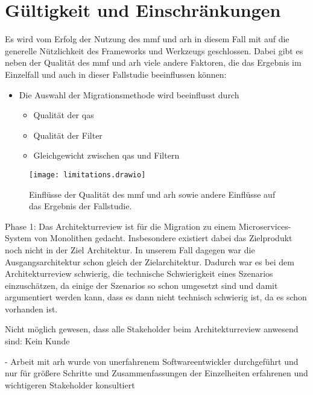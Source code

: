 \chapter{Gültigkeit und Einschränkungen}
\label{chap:gueltigkeit}

Es wird vom Erfolg der Nutzung des \gls{mmf} und \gls{arh} in diesem Fall mit \jf auf die generelle Nützlichkeit des Frameworks und Werkzeugs geschlossen.
Dabei gibt es neben der Qualität des \gls{mmf} und \gls{arh} viele andere Faktoren, die das Ergebnis im Einzelfall und auch in dieser Fallstudie beeinflussen können:

\begin{itemize}
	\item Die Auswahl der Migrationsmethode wird beeinflusst durch
	\begin{itemize}
		\item Qualität der \glspl{qa}
		\item Qualität der Filter
		\item Gleichgewicht zwischen \glspl{qa} und Filtern
	\end{itemize}
\end{itemize}

\begin{figure}
	\centering
	\texttt{[image: limitations.drawio]}
	\caption[Einflüsse auf das Ergebnis der Fallstudie]{
		Einflüsse der Qualität des \gls{mmf} und \gls{arh} sowie andere Einflüsse auf das Ergebnis der Fallstudie.
	}
	\label{fig:limitations}
\end{figure}

Phase 1:
Das Architekturreview ist für die Migration zu einem Microservices-System von Monolithen gedacht.
Insbesondere existiert dabei das Zielprodukt noch nicht in der Ziel Architektur. 
In unserem Fall dagegen war die Ausgangsarchitektur schon gleich der Zielarchitektur.
Dadurch war es bei dem Architekturreview schwierig, die technische Schwierigkeit eines Szenarios einzuschätzen, da einige der Szenarios so schon umgesetzt sind und damit argumentiert werden kann, dass es dann nicht technisch schwierig ist, da es schon vorhanden ist.

Nicht möglich gewesen, dass alle Stakeholder beim Architekturreview anwesend sind: Kein Kunde  

- Arbeit mit \gls{arh} wurde von unerfahrenem Softwareentwickler durchgeführt und nur für größere Schritte und Zusammenfassungen der Einzelheiten erfahrenen und wichtigeren Stakeholder konsultiert